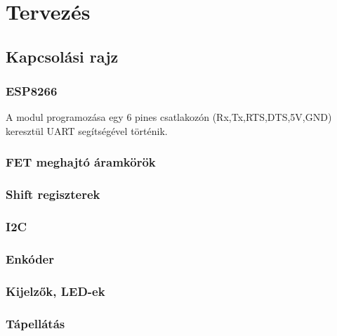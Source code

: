 \chapter{Tervezés}

\section{Kapcsolási rajz}

\subsection{ESP8266}
A modul programozása egy 6 pines csatlakozón (Rx,Tx,RTS,DTS,5V,GND) keresztül UART segítségével történik.

\subsection{FET meghajtó áramkörök}
\subsection{Shift regiszterek}
\subsection{I2C}
\subsection{Enkóder}
\subsection{Kijelzők, LED-ek}
\subsection{Tápellátás}